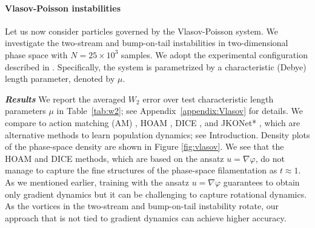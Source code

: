 \documentclass{article}
\theoremstyle{definition}
\theoremstyle{plain}
\theoremstyle{definition}
\theoremstyle{remark}
\begin{document}
\paragraph{Vlasov-Poisson instabilities}

Let us now consider particles governed by the Vlasov-Poisson system.  
We investigate the two-stream and bump-on-tail instabilities in two-dimensional phase space with $N = 25 \times 10^3$ samples. We adopt the experimental configuration described in \citep[Section B.2]{berman_parametric_2024}. Specifically, the system is parametrized by a characteristic (Debye) length parameter, denoted by $\mu$. 

\textbf{\emph{Results}} We report the averaged $W_2$ error over test characteristic length parameters $\mu$ in Table~\ref{tab:w2}; see Appendix~\ref{appendix:Vlasov} for details. We compare to action matching (AM) \cite{neklyudov_action_2023}, HOAM \cite{berman_parametric_2024}, DICE \cite{blickhan2025dicediscreteinversecontinuity}, and JKONet* \cite{terpin_2024_learning}, which are alternative methods to learn population dynamics; see Introduction.  Density plots of the phase-space density are shown in Figure \ref{fig:vlasov}. We see that the HOAM \cite{berman_parametric_2024} and DICE \cite{blickhan2025dicediscreteinversecontinuity} methods, which are based on the ansatz $u = \nabla \varphi$, do not manage to capture the fine structures of the phase-space filamentation as $t \approx 1$. As we mentioned earlier, training with the ansatz $u = \nabla \varphi$ guarantees to obtain only gradient dynamics but it can be challenging to capture rotational dynamics. As the vortices in the two-stream and bump-on-tail instability rotate, our approach that is not tied to gradient dynamics can achieve higher accuracy. 
\begin{table}
\centering
\caption{Kolmogorov flow: Samples generated with TPF match the energy spectrum decay $\omega^{-3}$ closely.}
\label{tab:SpectrumDecay}
\end{table}
\end{document}
